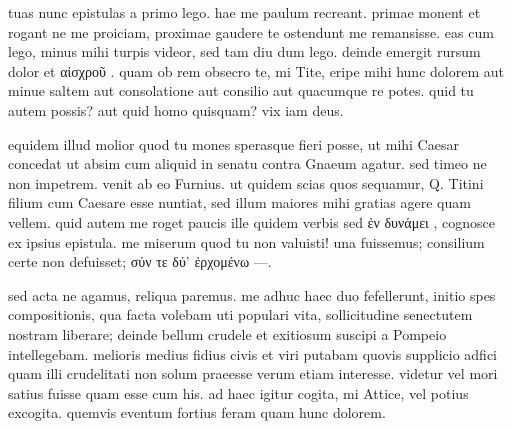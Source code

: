  tuas nunc epistulas a primo lego. hae me paulum recreant. primae monent et rogant ne me proiciam, proximae gaudere te ostendunt me remansisse. eas cum lego, minus mihi turpis videor, sed tam diu dum lego. deinde emergit rursum dolor et αἰσχροῦ . quam ob rem obsecro te, mi Tite, eripe mihi hunc dolorem aut minue saltem aut consolatione aut consilio aut quacumque re potes. quid tu autem possis? aut quid homo quisquam? vix iam deus.

 equidem illud molior quod tu mones sperasque fieri posse, ut mihi Caesar concedat ut absim cum aliquid in senatu contra Gnaeum agatur. sed timeo ne non impetrem. venit ab eo Furnius. ut quidem scias quos sequamur, Q. Titini filium cum Caesare esse nuntiat, sed illum maiores mihi gratias agere quam vellem. quid autem me roget paucis ille quidem verbis sed ἐν δυνάμει , cognosce ex ipsius epistula. me miserum quod tu non valuisti! una fuissemus; consilium certe non defuisset; σύν τε δύ' ἐρχομένω —.

 sed acta ne agamus, reliqua paremus. me adhuc haec duo fefellerunt, initio spes compositionis, qua facta volebam uti populari vita, sollicitudine senectutem nostram liberare; deinde bellum crudele et exitiosum suscipi a Pompeio intellegebam. melioris medius fidius civis et viri putabam quovis supplicio adfici quam illi crudelitati non solum praeesse verum etiam interesse. videtur vel mori satius fuisse quam esse cum his. ad haec igitur cogita, mi Attice, vel potius excogita. quemvis eventum fortius feram quam hunc dolorem.
